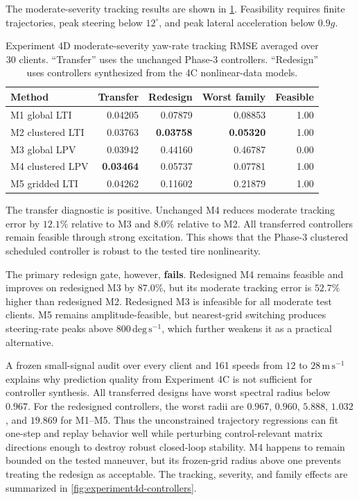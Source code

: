 The moderate-severity tracking results are shown in
\cref{tab:experiment4d-moderate}. Feasibility requires finite trajectories,
peak steering below $12^\circ$, and peak lateral acceleration below $0.9g$.

\begin{table}[htbp]
\centering
\caption{Experiment 4D moderate-severity yaw-rate tracking RMSE averaged over
30 clients. ``Transfer'' uses the unchanged Phase-3 controllers. ``Redesign''
uses controllers synthesized from the 4C nonlinear-data models.}
\label{tab:experiment4d-moderate}
\begin{tabular}{lrrrr}
\toprule
Method & Transfer & Redesign & Worst family & Feasible\\
\midrule
M1 global LTI       & 0.04205 & 0.07879 & 0.08853 & 1.00\\
M2 clustered LTI    & 0.03763 & \textbf{0.03758} & \textbf{0.05320} & 1.00\\
M3 global LPV       & 0.03942 & 0.44160 & 0.46787 & 0.00\\
M4 clustered LPV    & \textbf{0.03464} & 0.05737 & 0.07781 & 1.00\\
M5 gridded LTI      & 0.04262 & 0.11602 & 0.21879 & 1.00\\
\bottomrule
\end{tabular}
\end{table}

The transfer diagnostic is positive. Unchanged M4 reduces moderate tracking
error by $12.1\%$ relative to M3 and $8.0\%$ relative to M2. All transferred
controllers remain feasible through strong excitation. This shows that the
Phase-3 clustered scheduled controller is robust to the tested tire nonlinearity.

The primary redesign gate, however, \textbf{fails}. Redesigned M4 remains
feasible and improves on redesigned M3 by $87.0\%$, but its moderate tracking
error is $52.7\%$ higher than redesigned M2. Redesigned M3 is infeasible for all
moderate test clients. M5 remains amplitude-feasible, but nearest-grid switching
produces steering-rate peaks above $800\,\mathrm{deg\,s^{-1}}$, which further
weakens it as a practical alternative.

A frozen small-signal audit over every client and 161 speeds from $12$ to
$28\,\mathrm{m\,s^{-1}}$ explains why prediction quality from Experiment 4C is
not sufficient for controller synthesis. All transferred designs have worst
spectral radius below $0.967$. For the redesigned controllers, the worst radii
are $0.967$, $0.960$, $5.888$, $1.032$, and $19.869$ for M1--M5. Thus the
unconstrained trajectory regressions can fit one-step and replay behavior well
while perturbing control-relevant matrix directions enough to destroy robust
closed-loop stability. M4 happens to remain bounded on the tested maneuver, but
its frozen-grid radius above one prevents treating the redesign as acceptable.
The tracking, severity, and family effects are summarized in
\cref{fig:experiment4d-controllers}.

